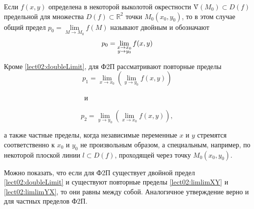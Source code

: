 Если $ f(x,y) $ определена в некоторой выколотой окрестности \r{V}$(M_0) \subset D(f) $ предельной для множества $ D(f) \subset \mathbb{R}^2 $ точки $ M_0 (x_0, y_0) $, то в этом случае
общий предел $ p_0 = \lim\limits_{M \to M_0} f(M) $ называют двойным и обозначают
\begin{equation}
    \label{lect02:doubleLimit}
    p_0 = \lim\limits_{ \substack{ x \to x_0 \\ y \to y_0 } } f(x, y)
\end{equation}

Кроме \eqref{lect02:doubleLimit}, для Ф2П рассматривают повторные пределы
\begin{equation}
    \label{lect02:limlimXY}
    p_1 = \lim\limits_{x \to x_0} \left( \lim\limits_{y \to y_0} f(x,y) \right)
\end{equation}

$ \;\;\;\;\;\;\;\;\;\;\;\;\;\;\;\;\;\;\;\;\;\;\;\;\;\;\;\;\;\;\;\;\;\;\;\;\;\;\;\;\; $ и

\begin{equation}
    \label{lect02:limlimYX}
    p_2 = \lim\limits_{y \to y_0} \left( \lim\limits_{x \to x_0} f(x,y) \right) ,
\end{equation}

а также частные пределы, когда независимые переменные $ x $ и $ y $ стремятся соответственно к $ x_0 $ и $ y_0 $ не произвольным образом, а специальным, например, по некоторой плоской линии
$ l \subset D(f) $, проходящей через точку $ M_0(x_0, y_0) $.

Можно показать, что если для Ф2П существует двойной предел \eqref{lect02:doubleLimit} и существуют повторные пределы \eqref{lect02:limlimXY} и \eqref{lect02:limlimYX},
то они равны между собой. Аналогичное утверждение верно и для частных пределов Ф2П.

